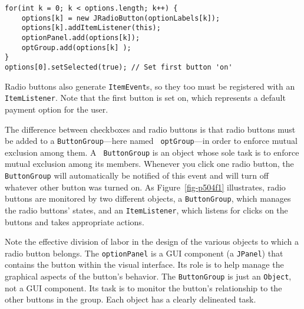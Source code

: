 \begin{jjjlisting}
\begin{lstlisting}
for(int k = 0; k < options.length; k++) {
    options[k] = new JRadioButton(optionLabels[k]);
    options[k].addItemListener(this);
    optionPanel.add(options[k]);
    optGroup.add(options[k] );
}
options[0].setSelected(true); // Set first button 'on'
\end{lstlisting}
\end{jjjlisting}

\noindent Radio buttons also generate {\tt ItemEvent}s, so they too
must be registered with an {\tt ItemListener}. Note that the
first button is set on, which represents a default payment
option for the user.

The difference between checkboxes and radio buttons is that radio
buttons must be added to a {\tt ButtonGroup}---here named {\tt
optGroup}---in order to enforce mutual exclusion among them.  A {\tt
ButtonGroup} is an object whose sole task is to enforce mutual
exclusion among its members. Whenever you click one radio button, the
{\tt ButtonGroup} will automatically be notified of this event and
will turn off whatever other button was turned on.  As
Figure~\ref{fig-p504f1} illustrates, radio buttons are monitored by
two different objects, a {\tt ButtonGroup}, which manages the radio
buttons' states, and an {\tt ItemListener}, which listens for clicks
on the buttons and takes appropriate actions.

\begin{figure}[h!]
\end{figure}

Note the effective division of labor in the design of
the various objects to which a radio button belongs. The
{\tt optionPanel} is a GUI component (a {\tt JPanel}) that contains the
button within the visual interface. Its role is to help manage the
graphical aspects of the button's behavior.  The {\tt ButtonGroup} is
just an {\tt Object}, not a GUI component. Its task is to monitor the
button's relationship to the other buttons in the group.  Each object
has a clearly delineated task.

